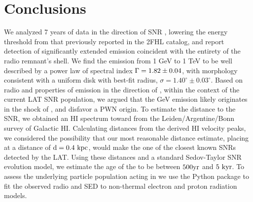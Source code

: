 




%
%
\section{Conclusions}\label{G150:Conc}
We analyzed 7 years of \FermiLat{} data in the direction of SNR \Gone{}, lowering the energy threshold from that previously reported in the 2FHL catalog, and report detection of significantly extended \gam{} emission coincident with the entirety of the radio remnant's shell. We find the emission from 1 GeV to 1 TeV to be well described by a power law of spectral index ${\Gamma = \rm 1.82 \pm 0.04}$, with  morphology consistent with a uniform disk with best-fit radius, {\rm $\sigma = 1.40^{\circ} \pm 0.03^{\circ}$}.  Based on radio and  \gam{} properties of emission in the direction of \Gone{}, within the context of the current LAT SNR population, we argued that the GeV emission likely originates in the shock of \Gone{}, and disfavor a PWN origin. To estimate the distance to the SNR, we obtained  an HI spectrum toward \Gone{} from the Leiden/Argentine/Bonn survey of Galactic HI. Calculating distances from the derived HI velocity peaks, we considered the possibility that our most reasonable distance estimate, placing \Gone{} at a distance of ${\rm d = 0.4~kpc}$, would make the \snr{} one of the closest known SNRs detected by the LAT. Using these distances and a standard Sedov-Taylor SNR evolution model, we estimate the age of the \Gone{} to be between ${\rm 500 yr}$ and ${\rm 5~kyr}$. %
To assess the underlying particle population acting in \Gone{} we use the \nai{} Python package to fit the observed radio and \gam{} SED to non-thermal electron and proton radiation models. %


